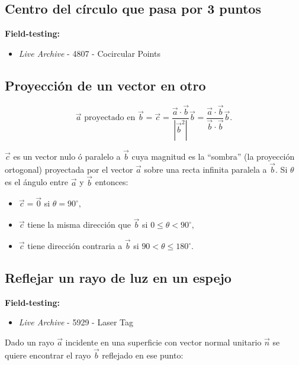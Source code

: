 \documentclass[10pt,letterpaper,twocolumn]{article}
\newcommand{\codigofuente}[1]{

\dotfill
}
\begin{document}
\codigofuente{./src/geometria/check_segment_intersection.cpp}

\subsection{Centro del círculo que pasa por 3 puntos}
\small
\textbf{Field-testing:}
\begin{itemize}
\item \emph{Live Archive} - 4807 - Cocircular Points
\end{itemize}
\normalsize

\codigofuente{./src/geometria/circle_through_3_points.cpp}

\subsection{Proyección de un vector en otro}

$$
\vec a \text{ proyectado en } \vec b = \vec c = \dfrac{\vec a \cdot \vec b}{|{\vec b}^2|} \vec b = \dfrac{\vec a \cdot \vec b}{\vec b \cdot \vec b} \vec b. $$

$\vec c$ es un vector nulo ó paralelo a $\vec b$ cuya magnitud es la ``sombra'' (la proyección ortogonal) proyectada por el vector $\vec a$ sobre una recta infinita paralela a $\vec b$. Si $\theta$ es el ángulo entre $\vec a$ y $\vec b$ entonces:

\begin{itemize}
    \item $\vec c = \vec 0$ si $\theta = 90^{\circ}, $
    \item $\vec c$ tiene la misma dirección que $\vec b$ si $0 \leq \theta < 90^{\circ}, $
    \item $\vec c$ tiene dirección contraria a $\vec b$ si $90 < \theta \leq 180^{\circ}. $
\end{itemize}

\subsection{Reflejar un rayo de luz en un espejo}

\textbf{Field-testing:}
\begin{itemize}
\item \emph{Live Archive} - 5929 - Laser Tag
\end{itemize}

Dado un rayo $\vec a$ incidente en una superficie con vector normal unitario $\vec n$ se quiere encontrar el rayo $\vec b$ reflejado en ese punto:
\end{document}
